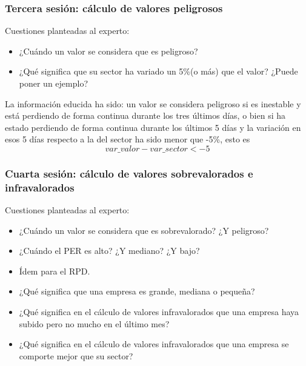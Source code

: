 \documentclass[a4paper,11pt]{article}
\begin{document}
\subsubsection{Tercera sesión: cálculo de valores peligrosos}

Cuestiones planteadas al experto:
\begin{itemize}
 \item ¿Cuándo un valor se considera que es peligroso?
 \item ¿Qué significa que su sector ha variado un 5\%(o más) que el valor? ¿Puede poner un ejemplo?
\end{itemize}

La información educida ha sido: un valor se considera peligroso si es inestable y está perdiendo de forma continua durante
los tres últimos días, o bien si ha estado perdiendo de forma continua durante los últimos 5 días y la variación en esos 5
días respecto a la del sector ha sido menor que -5\%, esto es $$var\_valor - var\_sector < - 5 $$

\subsubsection{Cuarta sesión: cálculo de valores sobrevalorados e infravalorados}

Cuestiones planteadas al experto:
\begin{itemize}
 \item ¿Cuándo un valor se considera que es sobrevalorado? ¿Y peligroso?
 \item ¿Cuándo el PER es alto? ¿Y mediano? ¿Y bajo?
 \item Ídem para el RPD.
 \item ¿Qué significa que una empresa es grande, mediana o pequeña?
 \item ¿Qué significa en el cálculo de valores infravalorados que una empresa haya subido pero no mucho en el último mes?
 \item ¿Qué significa en el cálculo de valores infravalorados que una empresa se comporte mejor que su sector?
\end{itemize} 
\end{document}
